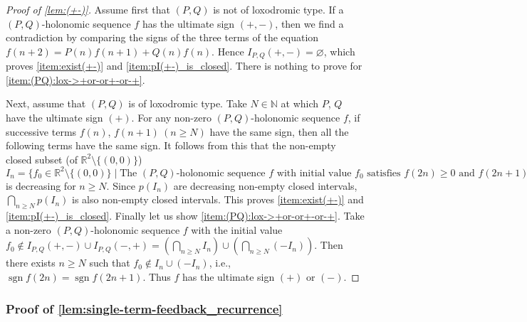 \documentclass[a4paper,UKenglish,cleveref,autoref,thm-restate]{lipics-v2021}
\newcommand{\R}{\mathbb{R}}
\newcommand{\N}{\mathbb{N}}
\DeclareMathOperator{\sgn}{sgn}
\begin{document}
\begin{proof}[Proof of \cref{lem:(+-)}]
Assume first that $(P, Q)$ is not of loxodromic type. If a $(P,Q)$-holonomic sequence $f$ has the ultimate sign $(+, -)$, then we find a contradiction by comparing the signs of the three terms of the equation $f(n+2) = P(n)f(n+1) + Q(n)f(n)$. Hence $I_{P, Q}(+, -) = \varnothing$, which proves \eqref{item:exist(+-)} and \eqref{item:pI(+-)_is_closed}. There is nothing to prove for \eqref{item:(PQ):lox->+or-or+-or-+}. 

Next, assume that $(P, Q)$ is of loxodromic type. 
Take $N \in \N$ at which $P$, $Q$ have the ultimate sign $(+)$. For any non-zero $(P, Q)$-holonomic sequence $f$, if successive terms $f(n)$, $f(n+1) \ (n \geq N)$ have the same sign, then all the following terms have the same sign. It follows from this that the non-empty closed subset (of $\R^2 \setminus \{ (0, 0) \}$) $I_n = \{ f_0 \in \R^2 \setminus \{(0, 0)\} \mid \text{The $(P, Q)$-holonomic sequence } f \text{ with initial value } f_0 \text{ satisfies } f(2n) \geq 0 \text{ and } f(2n+1) \leq 0. \}$ is decreasing for $n \geq N$. Since $p(I_n)$ are decreasing non-empty closed intervals, $\bigcap_{n \geq N} p(I_n)$ is also non-empty closed intervals. 
This proves \eqref{item:exist(+-)} and \eqref{item:pI(+-)_is_closed}. Finally let us show \eqref{item:(PQ):lox->+or-or+-or-+}. Take a non-zero $(P, Q)$-holonomic sequence $f$ with the initial value $f_0 \not\in I_{P, Q} (+, -) \cup I_{P, Q}(-, +) = \left( \bigcap_{n \geq N} I_n \right) \cup \left( \bigcap_{n \geq N} (-I_n) \right)$. Then there exists $n \geq N$ such that $f_0 \not\in I_n \cup (-I_n)$, i.e., $\sgn f(2n) = \sgn f(2n+1)$. Thus $f$ has the ultimate sign $(+)$ or $(-)$. 
\end{proof}

\subsubsection*{Proof of \cref{lem:single-term-feedback_recurrence}}
\end{document}
